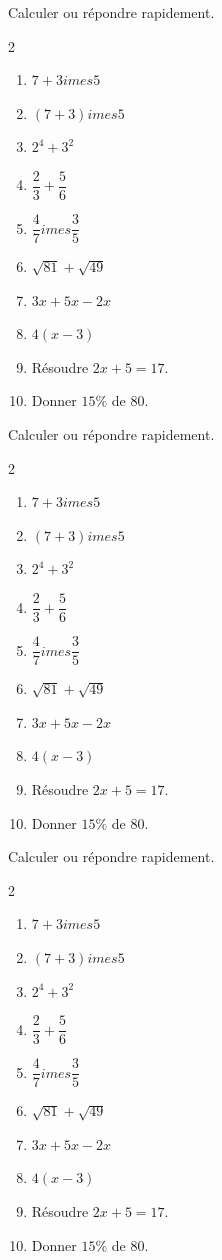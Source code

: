 \documentclass[11pt,a4paper]{article}
\newcounter{exercice}
\begin{document}
\begin{exercice}
Calculer ou répondre rapidement.
\begin{multicols}{2}
\begin{enumerate}[label=\alph*)]
  \item $7+3	imes 5$
  \item $(7+3)	imes 5$
  \item $2^4+3^2$
  \item $\dfrac{2}{3}+\dfrac{5}{6}$
  \item $\dfrac{4}{7}	imes\dfrac{3}{5}$
  \item $\sqrt{81}+\sqrt{49}$
  \item $3x+5x-2x$
  \item $4(x-3)$
  \item Résoudre $2x+5=17$.
  \item Donner $15\%$ de $80$.
\end{enumerate}
\end{multicols}
\end{exercice}
\begin{exercice}
Calculer ou répondre rapidement.
\begin{multicols}{2}
\begin{enumerate}[label=\alph*)]
  \item $7+3	imes 5$
  \item $(7+3)	imes 5$
  \item $2^4+3^2$
  \item $\dfrac{2}{3}+\dfrac{5}{6}$
  \item $\dfrac{4}{7}	imes\dfrac{3}{5}$
  \item $\sqrt{81}+\sqrt{49}$
  \item $3x+5x-2x$
  \item $4(x-3)$
  \item Résoudre $2x+5=17$.
  \item Donner $15\%$ de $80$.
\end{enumerate}
\end{multicols}
\end{exercice}
\begin{exercice}
Calculer ou répondre rapidement.
\begin{multicols}{2}
\begin{enumerate}[label=\alph*)]
  \item $7+3	imes 5$
  \item $(7+3)	imes 5$
  \item $2^4+3^2$
  \item $\dfrac{2}{3}+\dfrac{5}{6}$
  \item $\dfrac{4}{7}	imes\dfrac{3}{5}$
  \item $\sqrt{81}+\sqrt{49}$
  \item $3x+5x-2x$
  \item $4(x-3)$
  \item Résoudre $2x+5=17$.
  \item Donner $15\%$ de $80$.
\end{enumerate}
\end{multicols}
\end{exercice}
\end{document}
